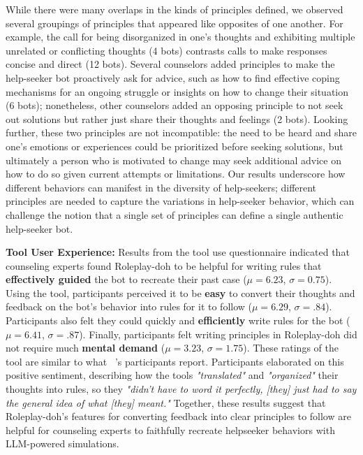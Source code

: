 While there were many overlaps in the kinds of principles defined, we observed several groupings of principles that appeared like opposites of one another. For example, the call for being disorganized in one's thoughts and exhibiting multiple unrelated or conflicting thoughts (4 bots) contrasts calls to make responses concise and direct (12 bots).  Several counselors added principles to make the help-seeker bot proactively ask for advice, such as how to find effective coping mechanisms for an ongoing struggle or insights on how to change their situation (6 bots); nonetheless, other counselors added an opposing principle to not seek out solutions but rather just share their thoughts and feelings (2 bots). Looking further, these two principles are not incompatible: the need to be heard and share one's emotions or experiences could be prioritized before seeking solutions, but ultimately a person who is motivated to change may seek additional advice on how to do so given current attempts or limitations. 
Our results underscore how different behaviors can manifest in the diversity of help-seekers; different principles are needed to capture the variations in help-seeker behavior, which can challenge the notion that a single set of principles can define a single authentic help-seeker bot. 


\textbf{Tool User Experience:} Results from the tool use questionnaire indicated that counseling experts found Roleplay-doh to be helpful for writing rules that \textbf{effectively guided} the bot to recreate their past case ($\mu=6.23$, $\sigma=0.75$). 
Using the tool, participants perceived it to be \textbf{easy} to convert their thoughts and feedback on the bot's behavior into rules for it to follow ($\mu=6.29$, $\sigma=.84$). Participants also felt they could quickly and \textbf{efficiently} write rules for the bot ($\mu=6.41$, $\sigma=.87$). Finally, participants felt writing principles in Roleplay-doh did not require much \textbf{mental demand} ($\mu=3.23$, $\sigma=1.75$). 
These ratings of the tool are similar to what ~\citet{petridis2023constitutionmaker}'s participants report. 
Participants elaborated on this positive sentiment, describing how the tools \emph{"translated"} and \emph{"organized"} their thoughts into rules, so they \emph{"didn't have to word it perfectly, [they] just had to say the general idea of what [they] meant."} Together, these results suggest that Roleplay-doh's features for converting feedback into clear principles to follow are helpful for counseling experts to faithfully recreate helpseeker behaviors with LLM-powered simulations.      

